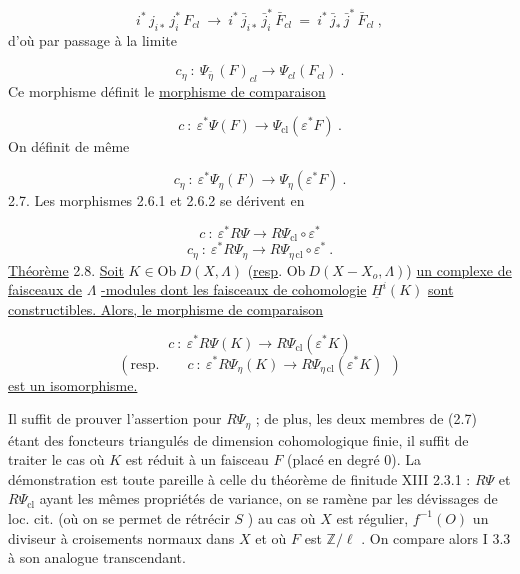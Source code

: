 \begin{equation*}
i^* \, j_{i*} \, j_i^* \, F_{cl} \ \longrightarrow \ i^* \, \bar{j}_{i*} \, \bar{j}_i^* \, \bar{F}_{cl} \ = \ i^* \, \bar{j}_* \, \bar{j}^* \, \bar{F}_{cl} \ ,
\end{equation*}
d'où par passage à la limite

\begin{equation*}
c_\eta \ : \ \Psi_{\bar{\eta}} \, (F)_{cl} \longrightarrow \Psi_{cl}(F_{cl}) \ .
\end{equation*}
Ce morphisme définit le \underline{morphisme de comparaison} 



\begin{equation}\tag{2.6.1}
c \ : \ \varepsilon^* \Psi(F) \longrightarrow \Psi_{\mathrm{cl}}(\varepsilon^* F) \ .
\end{equation}
On définit de même

\begin{equation}\tag{2.6.2}
c_\eta \ : \ \varepsilon^* \Psi_\eta(F) \longrightarrow \Psi_\eta(\varepsilon^* F) \ .
\end{equation}
2.7. Les morphismes 2.6.1 et 2.6.2 se dérivent en

\begin{equation*}
c \ : \ \varepsilon^* R\Psi \longrightarrow R\Psi_{\mathrm{cl}} \circ \varepsilon^*
\end{equation*}
\begin{equation*}
c_\eta \ : \ \varepsilon^* R\Psi_\eta \longrightarrow R\Psi_{\eta\,\mathrm{cl}} \circ \varepsilon^* \ .
\end{equation*}
\underline{Théorème} 2.8. \underline{Soit} $K \in \mathrm{Ob}\ D(X, \Lambda)$ (\underline{resp}. $\mathrm{Ob}\ D(X-X_o, \Lambda)$) \underline{un complexe de faisceaux de} $\Lambda$ \underline{-modules dont les faisceaux de cohomologie} $\underline{H}^i(K)$ \underline{sont constructibles. Alors, le morphisme de comparaison}

\begin{equation*}
c \ : \ \varepsilon^* R\Psi(K) \longrightarrow R\Psi_{\mathrm{cl}}(\varepsilon^* K)
\end{equation*}
\begin{equation*}
(\mathrm{resp.} \qquad c \ : \ \varepsilon^* R\Psi_\eta(K) \longrightarrow R\Psi_{\eta\,\mathrm{cl}}(\varepsilon^* K) \ \ )
\end{equation*}
\underline{est un isomorphisme.}

Il suffit de prouver l'assertion pour $R\Psi_\eta$ ; de plus, les deux membres de (2.7) étant des foncteurs triangulés de dimension cohomologique finie, il suffit de traiter le cas où $K$ est réduit à un faisceau $F$ (placé en degré $0$). La démonstration est toute pareille à celle du théorème de finitude XIII 2.3.1 : $R\Psi$ et $R\Psi_{\mathrm{cl}}$ ayant les mêmes propriétés de variance, on se ramène par les dévissages de loc. cit. (où on se permet de rétrécir $S$ ) au cas où $X$ est régulier, $f^{-1}(O)$ un diviseur à croisements normaux dans $X$ et où $F$ est $\mathbb{Z}/\ell$ . On compare alors I 3.3 à son analogue transcendant.


